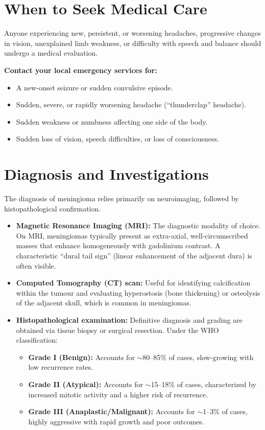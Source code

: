 \section*{When to Seek Medical Care}
Anyone experiencing new, persistent, or worsening headaches, progressive changes in vision, unexplained limb weakness, or difficulty with speech and balance should undergo a medical evaluation.

\textbf{Contact your local emergency services for:}
\begin{itemize}
    \item A new-onset seizure or sudden convulsive episode.
    \item Sudden, severe, or rapidly worsening headache (``thunderclap'' headache).
    \item Sudden weakness or numbness affecting one side of the body.
    \item Sudden loss of vision, speech difficulties, or loss of consciousness.
\end{itemize}

\section*{Diagnosis and Investigations}
The diagnosis of meningioma relies primarily on neuroimaging, followed by histopathological confirmation.
\begin{itemize}
    \item \textbf{Magnetic Resonance Imaging (MRI):} The diagnostic modality of choice. On MRI, meningiomas typically present as extra-axial, well-circumscribed masses that enhance homogeneously with gadolinium contrast. A characteristic ``dural tail sign'' (linear enhancement of the adjacent dura) is often visible.
    \item \textbf{Computed Tomography (CT) scan:} Useful for identifying calcification within the tumour and evaluating hyperostosis (bone thickening) or osteolysis of the adjacent skull, which is common in meningiomas.
    \item \textbf{Histopathological examination:} Definitive diagnosis and grading are obtained via tissue biopsy or surgical resection. Under the WHO classification:
        \begin{itemize}
            \item \textbf{Grade I (Benign):} Accounts for $\sim$80--85\% of cases, slow-growing with low recurrence rates.
            \item \textbf{Grade II (Atypical):} Accounts for $\sim$15--18\% of cases, characterized by increased mitotic activity and a higher risk of recurrence.
            \item \textbf{Grade III (Anaplastic/Malignant):} Accounts for $\sim$1--3\% of cases, highly aggressive with rapid growth and poor outcomes.
        \end{itemize}
\end{itemize}

